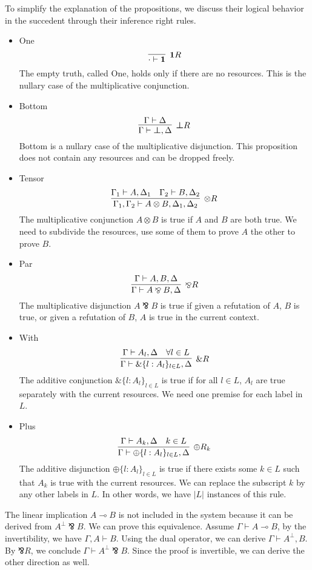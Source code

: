 \documentclass[12pt, openany]{memoir}
\newcommand*{\pare}[0]{\mathbin{\bindnasrepma}}
\begin{document}
To simplify the explanation of the propositions, we discuss their logical behavior in the succedent through their inference right rules.
\begin{itemize}
  \item One
  \[
    \infer[\textbf{1}R]{\cdot \vdash \textbf{1}}{}
  \]
  The empty truth, called One, holds only if there are no resources. 
  This is the nullary case of the multiplicative conjunction.
  \item Bottom
  \[
    \infer[\boldsymbol{\bot} R]{\Gamma \vdash \boldsymbol{\bot}, \Delta}{
      \Gamma \vdash \Delta
    }
  \]
  Bottom is a nullary case of the multiplicative disjunction.
  This proposition does not contain any resources and can be dropped freely.
  \item Tensor
  \[
    \infer[\otimes R]{\Gamma_1, \Gamma_2 \vdash A \otimes B, \Delta_1, \Delta_2}{
      \Gamma_1 \vdash A, \Delta_1
      &
      \Gamma_2 \vdash B, \Delta_2
    }
  \]
  The multiplicative conjunction $A \otimes B$ is true if $A$ and $B$ are both true.
  We need to subdivide the resources, use some of them to prove $A$ the other to prove $B$. 
  \item Par
  \[
    \infer[\pare R]{\Gamma \vdash A \pare B, \Delta}{
      \Gamma \vdash A, B, \Delta
    }
  \]
  The multiplicative disjunction $A \pare B$ is true if given a refutation of $A$, $B$ is true,
  or given a refutation of $B$, $A$ is true in the current context.
  \item With
  \[
    \infer[\& R]{\Gamma \vdash \&\{l : A_l\}_{l \in L}, \Delta}{
      \Gamma \vdash A_l, \Delta
      &
      \forall l \in L
    }
  \]
  The additive conjunction $\&\{l : A_l\}_{l \in L}$ is true if for all $l \in L$, $A_l$ are true separately with the current resources.
  We need one premise for each label in $L$.
  \item Plus
  \[
    \infer[\oplus R_k]{\Gamma \vdash \oplus\{l : A_l\}_{l \in L}, \Delta}{
      \Gamma \vdash A_k, \Delta
      &
      k \in L
    }
  \]
  The additive disjunction $\oplus\{l : A_l\}_{l \in L}$ is true if there exists some $k \in L$ such that $A_k$ is true with the current resources.
  We can replace the subscript $k$ by any other labels in $L$. In other words, we have $|L|$ instances of this rule.
\end{itemize}
The linear implication $A \multimap B$ is not included in the system because it can be derived from $A^\bot \pare B$. 
We can prove this equivalence. Assume $\Gamma \vdash A \multimap B$, by the invertibility, we have $\Gamma, A \vdash B$. 
Using the dual operator, we can derive $\Gamma \vdash A^\bot, B$. By $\pare R$, we conclude $\Gamma \vdash A^\bot \pare B$. 
Since the proof is invertible, we can derive the other direction as well.
\end{document}
